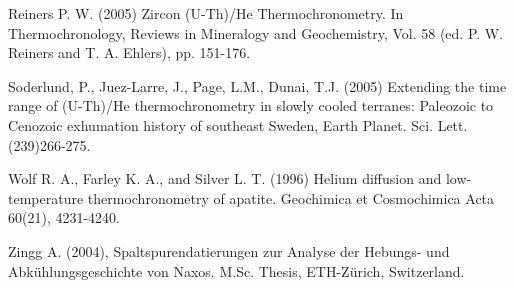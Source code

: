 \documentclass{article}
\begin{document}
\begin{description}
\item Reiners P. W. (2005) Zircon (U-Th)/He Thermochronometry. In
Thermochronology, Reviews in Mineralogy and Geochemistry, Vol. 58 (ed.
P. W. Reiners and T. A. Ehlers), pp. 151-176.

\item Soderlund, P., Juez-Larre, J., Page, L.M., Dunai, T.J. (2005) 
Extending the time range of (U-Th)/He thermochronometry in slowly
cooled terranes: Paleozoic to Cenozoic exhumation history of
southeast Sweden, Earth Planet. Sci. Lett. (239)266-275.

\item Wolf R. A., Farley K. A., and Silver L. T. (1996) Helium
diffusion and low-temperature thermochronometry of apatite.
Geochimica et Cosmochimica Acta 60(21), 4231-4240.

\item Zingg A. (2004), Spaltspurendatierungen zur Analyse der Hebungs-
und Abk\"{u}hlungsgeschichte von Naxos. M.Sc. Thesis, ETH-Z\"{u}rich,
Switzerland.

\end{description}
\end{document}
